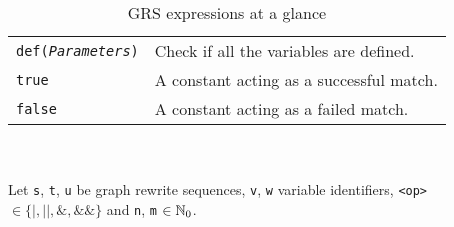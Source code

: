 \begin{table}[htbp]
\begin{minipage}{\linewidth}
\begin{tabularx}{\linewidth}{|lX|}
\texttt{def(\emph{Parameters})} & Check if all the variables are defined.\\
\texttt{true}	& A constant acting as a successful match.\\
\texttt{false}	& A constant acting as a failed match.\\ \hline
\end{tabularx}\indexmain{\texttt{\textasciicircum}}
\indexmain{\texttt{\&}}\indexmain{\texttt{*}}
\end{minipage}\\
\\ 
{\small Let \texttt{s}, \texttt{t}, \texttt{u} be graph rewrite sequences, \texttt{v}, \texttt{w} variable identifiers, \texttt{<op>} $\in \{\texttt{|}, \texttt{||}, \texttt{\&}, \texttt{\&\&}\}$ and \texttt{n}, \texttt{m} $\in \mathbb{N}_0$.}
\caption{GRS expressions at a glance}
\label{ruletab}
\end{table}
\makeatother
 
 